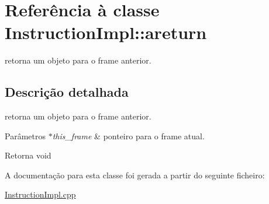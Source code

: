 \hypertarget{class_instruction_impl_1_1areturn}{}\section{Referência à classe Instruction\+Impl\+:\+:areturn}
\label{class_instruction_impl_1_1areturn}


retorna um objeto para o frame anterior.  




\subsection{Descrição detalhada}
retorna um objeto para o frame anterior. 


\begin{DoxyParams}{Parâmetros}
{\em $\ast$this\+\_\+frame} & ponteiro para o frame atual. \\
\hline
\end{DoxyParams}
\begin{DoxyReturn}{Retorna}
void 
\end{DoxyReturn}


A documentação para esta classe foi gerada a partir do seguinte ficheiro\+:\begin{DoxyCompactItemize}
\item 
\hyperlink{_instruction_impl_8cpp}{Instruction\+Impl.\+cpp}\end{DoxyCompactItemize}
